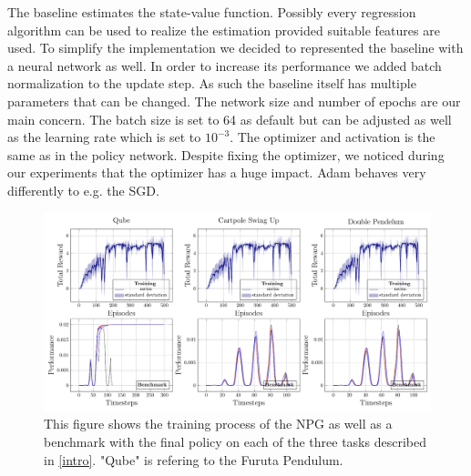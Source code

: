 \begin{itemize}
  The baseline estimates the state-value function. Possibly every regression algorithm can be used to realize the estimation provided suitable features are used. To simplify the implementation we decided to represented the baseline with a neural network as well. In order to increase its performance we added batch normalization to the update step. As such the baseline itself has multiple parameters that can be changed. The network size and number of epochs are our main concern. The batch size is set to 64 as default but can be adjusted as well as the learning rate which is set to $10^{-3}$. The optimizer and activation is the same as in the policy network. Despite fixing the optimizer, we noticed during our experiments that the optimizer has a huge impact. Adam behaves very differently to e.g. the SGD.
\end{itemize}
\begin{figure}
\centering
\includegraphics[width=\textwidth]{plots/learned_benchmarked_NPG.pdf}
\caption{This figure shows the training process of the NPG as well as a benchmark with the final policy on each of the three tasks described in \autoref{intro}. "Qube" is refering to the Furuta Pendulum.}
\label{fig:NPG_final}
\end{figure}

